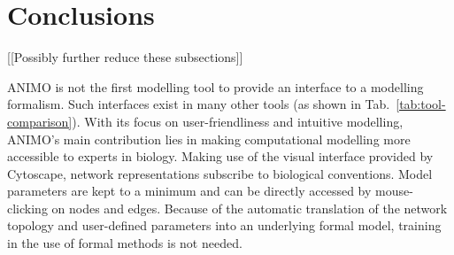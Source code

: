 \documentclass{bmcart}
\begin{document}
\section*{Conclusions}
{\Large [[Possibly further reduce these subsections]]}
% 
% 

ANIMO is not the first modelling tool to provide an interface to a
modelling formalism. Such interfaces exist in many other tools (as shown in Tab.~\ref{tab:tool-comparison}). With its
focus on user-friendliness and intuitive modelling, ANIMO's main contribution lies 
in making computational modelling more accessible to experts in biology.
Making use of the visual
interface provided by Cytoscape, network representations subscribe to biological conventions. 
Model parameters are kept to a minimum and can be directly accessed by mouse-clicking on 
nodes and edges. Because of the automatic translation of the network topology and 
user-defined parameters into an underlying formal model, training in the use of formal methods 
is not needed.
\end{document}
